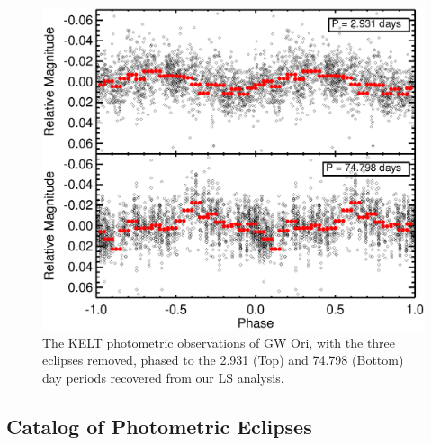 \documentclass[twocolumn]{aastex61}
\begin{document}
\begin{figure}[!ht]
\centering\includegraphics[width=0.99\linewidth, trim = 0 3.5in 0 0]{Figure_Phased.eps}
\caption{The KELT photometric observations of GW Ori, with the three eclipses removed, phased to the 2.931 (Top) and 74.798 (Bottom) day periods recovered from our LS analysis. }%
\label{figure:phased}
\end{figure}



\subsection{Catalog of Photometric Eclipses}
\end{document}
